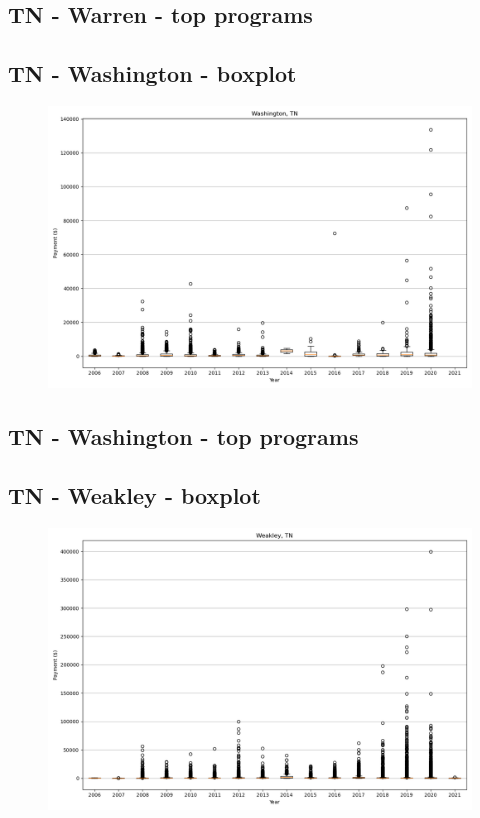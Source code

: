 \subsection*{TN - Warren - top programs}

\newpage
\subsection*{TN - Washington - boxplot}
\begin{figure}[h]
\centering
\includegraphics[width=7in]{../output/boxplots/counties/Washington-TN_boxplot.png}
\end{figure}


\subsection*{TN - Washington - top programs}

\newpage
\subsection*{TN - Weakley - boxplot}
\begin{figure}[h]
\centering
\includegraphics[width=7in]{../output/boxplots/counties/Weakley-TN_boxplot.png}
\end{figure}


